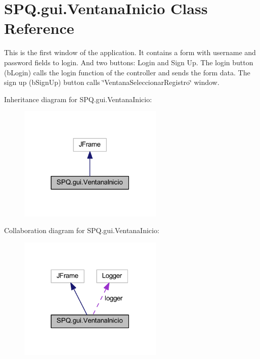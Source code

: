 \hypertarget{class_s_p_q_1_1gui_1_1_ventana_inicio}{}\section{S\+P\+Q.\+gui.\+Ventana\+Inicio Class Reference}
\label{class_s_p_q_1_1gui_1_1_ventana_inicio}


This is the first window of the application. It contains a form with username and password fields to login. And two buttons\+: Login and Sign Up. The login button (b\+Login) calls the login function of the controller and sends the form data. The sign up (b\+Sign\+Up) button calls \char`\"{}\+Ventana\+Seleccionar\+Registro\char`\"{} window.  




Inheritance diagram for S\+P\+Q.\+gui.\+Ventana\+Inicio\+:\nopagebreak
\begin{figure}[H]
\begin{center}
\leavevmode
\includegraphics[width=195pt]{class_s_p_q_1_1gui_1_1_ventana_inicio__inherit__graph}
\end{center}
\end{figure}


Collaboration diagram for S\+P\+Q.\+gui.\+Ventana\+Inicio\+:\nopagebreak
\begin{figure}[H]
\begin{center}
\leavevmode
\includegraphics[width=195pt]{class_s_p_q_1_1gui_1_1_ventana_inicio__coll__graph}
\end{center}
\end{figure}
